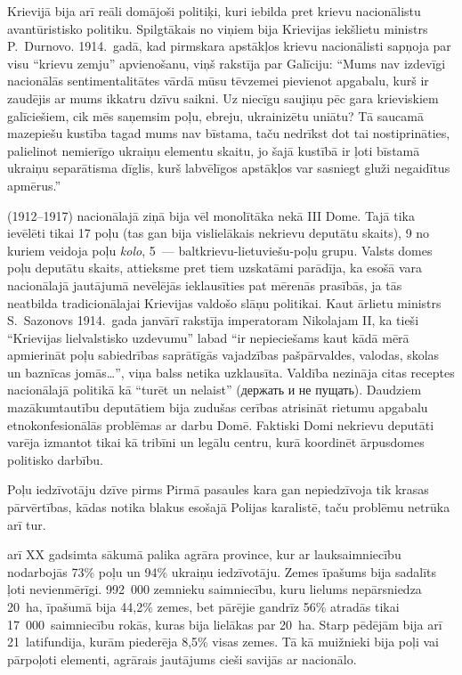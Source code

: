 \documentclass[twoside,a5paper,12pt,fleqn,openany]{extbook}
\newcommand{\pltxti}[1]{\textit{\textpolish{#1}}}
\newcommand{\rutxti}[1]{\textrussian{#1}}
\begin{document}
Krievijā bija arī reāli domājoši politiķi, kuri iebilda pret krievu nacionālistu avantūristisko politiku. Spilgtākais no viņiem bija Krievijas iekšlietu ministrs P.~Durnovo. 1914.~gadā, kad pirmskara apstākļos krievu nacionālisti sapņoja par visu ``krievu zemju'' apvienošanu, viņš rakstīja par Galīciju: ``Mums nav izdevīgi nacionālās sentimentalitātes vārdā mūsu tēvzemei pievienot apgabalu, kurš ir zaudējis ar mums ikkatru dzīvu saikni. Uz niecīgu saujiņu pēc gara krieviskiem galīciešiem, cik mēs saņemsim poļu, ebreju, ukrainizētu uniātu? Tā saucamā mazepiešu kustība tagad mums nav bīstama, taču nedrīkst dot tai nostiprināties, palielinot nemierīgo ukraiņu elementu skaitu, jo šajā kustībā ir ļoti bīstamā ukraiņu separātisma dīglis, kurš labvēlīgos apstākļos var sasniegt gluži negaidītus apmērus.''

 (1912--1917) nacionālajā ziņā bija vēl monolītāka nekā III Dome. Tajā tika ievēlēti tikai 17 poļu (tas gan bija vislielākais nekrievu deputātu skaits), 9 no kuriem veidoja poļu \pltxti{kolo}, 5~--- baltkrievu-lietuviešu-poļu grupu. Valsts domes poļu deputātu skaits, attieksme pret tiem uzskatāmi parādīja, ka esošā vara nacionālajā jautājumā nevēlējās ieklausīties pat mērenās prasībās, ja tās neatbilda tradicionālajai Krievijas valdošo slāņu politikai. Kaut ārlietu ministrs S.~Sazonovs 1914.~gada janvārī rakstīja imperatoram Nikolajam II, ka tieši ``Krievijas lielvalstisko uzdevumu'' labad ``ir nepieciešams kaut kādā mērā apmierināt poļu sabiedrības saprātīgās vajadzības pašpārvaldes, valodas, skolas un baznīcas jomās\dots{}'', viņa balss netika uzklausīta. Valdība nezināja citas receptes nacionālajā politikā kā ``turēt un nelaist'' (\rutxti{держать и не пущать}). Daudziem mazākumtautību deputātiem bija zudušas cerības atrisināt rietumu apgabalu etnokonfesionālās problēmas ar darbu Domē. Faktiski Domi nekrievu deputāti varēja izmantot tikai kā tribīni un legālu centru, kurā koordinēt ārpusdomes politisko darbību.

Poļu iedzīvotāju dzīve  pirms Pirmā pasaules kara gan nepiedzīvoja tik krasas pārvērtības, kādas notika blakus esošajā Polijas karalistē, taču problēmu netrūka arī tur.

 arī XX gadsimta sākumā palika agrāra province, kur ar lauksaimniecību nodarbojās 73\% poļu un 94\% ukraiņu iedzīvotāju. Zemes īpašums bija sadalīts ļoti nevienmērīgi. 992~000 zemnieku saimniecību, kuru lielums nepārsniedza 20~ha, īpašumā bija 44,2\% zemes, bet pārējie gandrīz 56\% atradās tikai 17~000~saimniecību rokās, kuras bija lielākas par 20~ha. Starp pēdējām bija arī 21~latifundija, kurām piederēja 8,5\% visas zemes. Tā kā muižnieki bija poļi vai pārpoļoti elementi, agrārais jautājums cieši savijās ar nacionālo.
\end{document}
